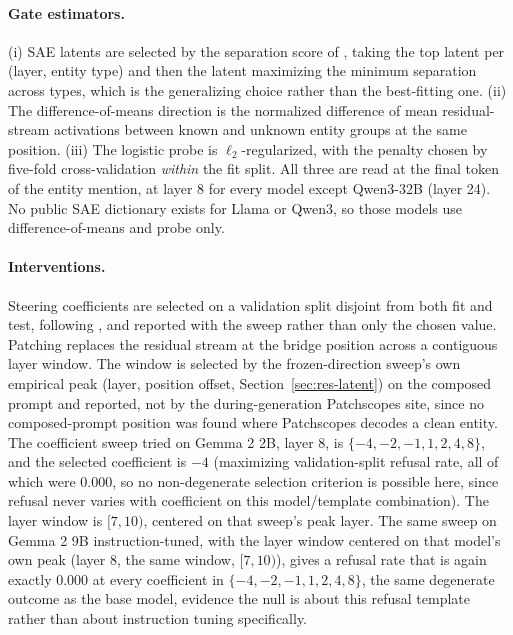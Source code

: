\documentclass{article}
\begin{document}
\paragraph{Gate estimators.} (i) SAE latents are selected by the separation score of
\citet{ferrando2025entity}, taking the top latent per (layer, entity type) and then the latent
maximizing the minimum separation across types, which is the generalizing choice rather than the
best-fitting one. (ii) The difference-of-means direction is the normalized difference of mean
residual-stream activations between known and unknown entity groups at the same position.
(iii) The logistic probe is $\ell_2$-regularized, with the penalty chosen by five-fold
cross-validation \emph{within} the fit split. All three are read at the final token of the entity
mention, at layer 8 for every model except Qwen3-32B (layer 24). No public SAE dictionary exists for
Llama or Qwen3, so those models use difference-of-means and probe only.

\paragraph{Interventions.} Steering coefficients are selected on a validation split disjoint from
both fit and test, following \citet{ferrando2025entity}, and reported with the sweep rather than only
the chosen value. Patching replaces the residual stream at the bridge position across a contiguous
layer window. The window is selected by the frozen-direction sweep's own empirical peak (layer,
position offset, Section~\ref{sec:res-latent}) on the composed prompt and reported, not by the
during-generation Patchscopes site, since no composed-prompt position was found where Patchscopes
decodes a clean entity.
The coefficient sweep tried on Gemma 2 2B, layer 8, is $\{-4,-2,-1,1,2,4,8\}$, and the selected
coefficient is $-4$ (maximizing validation-split refusal rate, all of which were $0.000$, so no
non-degenerate selection criterion is possible here, since refusal never varies with coefficient on
this model/template combination). The layer window is $[7,10)$, centered on that sweep's peak layer.
The same sweep on Gemma 2 9B instruction-tuned, with the layer window centered on that model's own
peak (layer 8, the same window, $[7,10)$), gives a refusal rate that is again exactly $0.000$ at every
coefficient in $\{-4,-2,-1,1,2,4,8\}$, the same degenerate outcome as the base model, evidence the
null is about this refusal template rather than about instruction tuning specifically.
\end{document}
